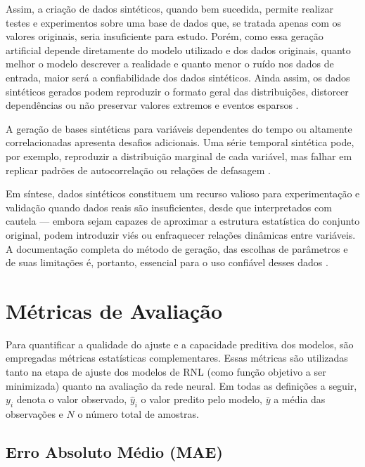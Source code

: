 Assim, a criação de dados sintéticos, quando bem sucedida, permite realizar testes e experimentos sobre uma base de dados que, se tratada apenas com os valores originais, seria insuficiente para estudo. Porém, como essa geração artificial depende diretamente do modelo utilizado e dos dados originais, quanto melhor o modelo descrever a realidade e quanto menor o ruído nos dados de entrada, maior será a confiabilidade dos dados sintéticos. Ainda assim, os dados sintéticos gerados podem reproduzir o formato geral das distribuições, distorcer dependências ou não preservar valores extremos e eventos esparsos \cite{nowok2016synthpop, stenger2024synthetic}.

A geração de bases sintéticas para variáveis dependentes do tempo ou altamente correlacionadas apresenta desafios adicionais. Uma série temporal sintética pode, por exemplo, reproduzir a distribuição marginal de cada variável, mas falhar em replicar padrões de autocorrelação ou relações de defasagem \cite{stenger2024synthetic}.

Em síntese, dados sintéticos constituem um recurso valioso para experimentação e validação quando dados reais são insuficientes, desde que interpretados com cautela — embora sejam capazes de aproximar a estrutura estatística do conjunto original, podem introduzir viés ou enfraquecer relações dinâmicas entre variáveis. A documentação completa do método de geração, das escolhas de parâmetros e de suas limitações é, portanto, essencial para o uso confiável desses dados \cite{nowok2016synthpop, stenger2024synthetic}.

\section{Métricas de Avaliação}

Para quantificar a qualidade do ajuste e a capacidade preditiva dos modelos, são empregadas métricas estatísticas complementares. Essas métricas são utilizadas tanto na etapa de ajuste dos modelos de \ac{RNL} (como função objetivo a ser minimizada) quanto na avaliação da rede neural. Em todas as definições a seguir, \(y_i\) denota o valor observado, \(\hat{y}_i\) o valor predito pelo modelo, \(\bar{y}\) a média das observações e \(N\) o número total de amostras.

\subsection{Erro Absoluto Médio (\ac{MAE})}

